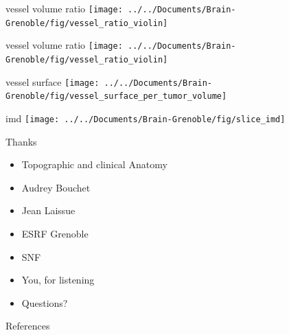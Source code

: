 \documentclass[caption=numbered]{beamer}
\newcommand{\imsize}{\linewidth}
\begin{document}
\renewcommand{\imsize}{0.9\linewidth}	
\begin{frame}{vessel volume ratio}
	\texttt{[image: ../../Documents/Brain-Grenoble/fig/vessel\_ratio\_violin]}
\end{frame}

\renewcommand{\imsize}{0.9\linewidth}	
\begin{frame}{vessel volume ratio}
	\texttt{[image: ../../Documents/Brain-Grenoble/fig/vessel\_ratio\_violin]}
\end{frame}

\begin{frame}{vessel surface}
	\texttt{[image: ../../Documents/Brain-Grenoble/fig/vessel\_surface\_per\_tumor\_volume]}
\end{frame}

\begin{frame}{imd}
    \texttt{[image: ../../Documents/Brain-Grenoble/fig/slice\_imd]}
\end{frame}

\begin{frame}{Thanks}
	\begin{itemize}
		\item Topographic and clinical Anatomy
		\item Audrey Bouchet
		\item Jean Laissue
		\item ESRF Grenoble
		\item SNF
		\pause
		\item You, for listening
		\pause
		\item Questions?
	\end{itemize}
\end{frame}

\begin{frame}[allowframebreaks]{References}
	\renewcommand*{\bibfont}{\tiny}
	\printbibliography
\end{frame}
\end{document}
